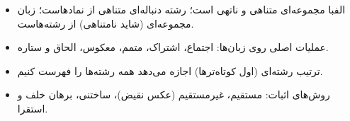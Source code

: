 \begin{summary}
\begin{itemize}
\item الفبا مجموعه‌ای متناهی و ناتهی است؛ رشته دنباله‌ای متناهی از نمادهاست؛ زبان مجموعه‌ای (شاید نامتناهی) از رشته‌هاست.
\item عملیات اصلی روی زبان‌ها: اجتماع، اشتراک، متمم، معکوس، الحاق و ستاره.
\item ترتیب رشته‌ای (اول کوتاه‌ترها) اجازه می‌دهد همه رشته‌ها را فهرست کنیم.
\item روش‌های اثبات: مستقیم، غیرمستقیم (عکس نقیض)، ساختنی، برهان خلف و استقرا.
\end{itemize}
\end{summary}
